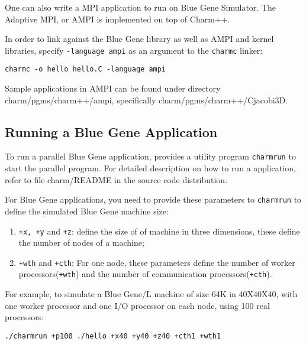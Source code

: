One can also write a MPI application to run on Blue Gene Simulator.
The Adaptive MPI, or AMPI is implemented on top of Charm++.

In order to link against the Blue Gene library as well as AMPI and \charmpp{} 
kernel libraries, specify 
\texttt{-language ampi} as an argument to the {\tt charmc} linker:
\begin{verbatim}
charmc -o hello hello.C -language ampi
\end{verbatim}

Sample applications in AMPI can be found under directory
charm/pgms/charm++/ampi, specifically charm/pgms/charm++/Cjacobi3D.

\subsection{Running a Blue Gene Application}

To run a parallel Blue Gene application, \charmpp{} provides a utility program
{\tt charmrun} to start the parallel program. For detailed description on
how to run a \charmpp{} application, refer to file charm/README in the
source code distribution.

For Blue Gene applications, you need to provide these parameters to 
{\tt charmrun} to define the simulated Blue Gene machine size:
\begin{enumerate}
\item {\tt +x, +y} and {\tt +z}:  define the size of of machine in three dimensions, these define the number of nodes of a machine;
\item {\tt +wth} and {\tt +cth}:  For one node, these parameters define the number of worker processors({\tt +wth}) and the number of communication processors({\tt +cth}).
\end{enumerate}

For example, to simulate a Blue Gene/L machine of size 64K in 40X40X40, with 
one worker processor and one I/O processor on each node, using 100 
real processors:
\begin{verbatim}
./charmrun +p100 ./hello +x40 +y40 +z40 +cth1 +wth1
\end{verbatim}


